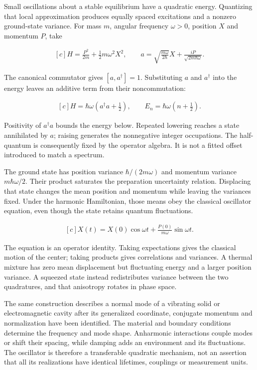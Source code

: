\documentclass[11pt,oneside]{book}
\newenvironment{centeredalign}{\[\begin{gathered}[c]}{\end{gathered}\]}
\begin{document}
\label{topic:quantum-harmonic-oscillator}

Small oscillations about a stable equilibrium have a quadratic energy. Quantizing that local approximation produces equally spaced excitations and a nonzero ground-state variance. For mass \(m\), angular frequency \(\omega>0\), position \(X\) and momentum \(P\), take

\begin{centeredalign}
H=\frac{P^2}{2m}+\frac12m\omega^2X^2,\qquad
a=\sqrt{\frac{m\omega}{2\hbar}}X+\frac{iP}{\sqrt{2m\hbar\omega}}.
\end{centeredalign}

The canonical commutator gives \([a,a^\dagger]=1\). Substituting \(a\) and \(a^\dagger\) into the energy leaves an additive term from their noncommutation:

\begin{centeredalign}
H=\hbar\omega\left(a^\dagger a+\frac12\right),\qquad
E_n=\hbar\omega\left(n+\frac12\right).
\end{centeredalign}

Positivity of \(a^\dagger a\) bounds the energy below. Repeated lowering reaches a state annihilated by \(a\); raising generates the nonnegative integer occupations. The half-quantum is consequently fixed by the operator algebra. It is not a fitted offset introduced to match a spectrum.

The ground state has position variance \(\hbar/(2m\omega)\) and momentum variance \(m\hbar\omega/2\). Their product saturates the preparation uncertainty relation. Displacing that state changes the mean position and momentum while leaving the variances fixed. Under the harmonic Hamiltonian, those means obey the classical oscillator equation, even though the state retains quantum fluctuations.

\begin{centeredalign}
X(t)=X(0)\cos\omega t+\frac{P(0)}{m\omega}\sin\omega t.
\end{centeredalign}

The equation is an operator identity. Taking expectations gives the classical motion of the center; taking products gives correlations and variances. A thermal mixture has zero mean displacement but fluctuating energy and a larger position variance. A squeezed state instead redistributes variance between the two quadratures, and that anisotropy rotates in phase space.

The same construction describes a normal mode of a vibrating solid or electromagnetic cavity after its generalized coordinate, conjugate momentum and normalization have been identified. The material and boundary conditions determine the frequency and mode shape. Anharmonic interactions couple modes or shift their spacing, while damping adds an environment and its fluctuations. The oscillator is therefore a transferable quadratic mechanism, not an assertion that all its realizations have identical lifetimes, couplings or measurement units.
\end{document}
